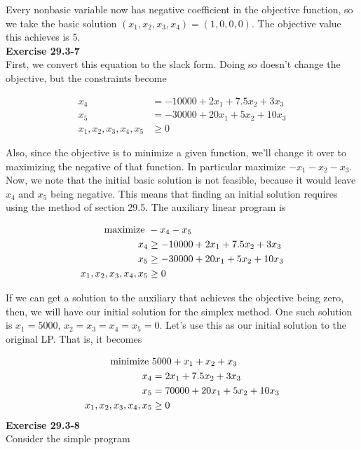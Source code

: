 \documentclass{article}
\begin{document}
Every nonbasic variable now has negative coefficient in the objective function, so we take the basic solution $(x_1,x_2,x_3,x_4) = (1,0,0,0)$. The objective value this achieves is 5. \\


\noindent\textbf{Exercise 29.3-7}\\

First, we convert this equation to the slack form. Doing so doesn't change the objective, but the constraints become

\begin{align*}
x_4 & = -10000 + 2x_1 + 7.5x_2 + 3x_3\\
x_5 & = -30000 + 20x_1 + 5x_2 + 10x_3 \\
x_1,x_2,x_3,x_4,x_5 &\ge 0
\end{align*}

Also, since the objective is to minimize a given function, we'll change it over to maximizing the negative of that function. In particular maximize $-x_1 -x_2 -x_3$. Now, we note that the initial basic solution is not feasible, because it would leave $x_4$ and $x_5$ being negative. This means that finding an initial solution requires using the method of section 29.5. The auxiliary linear program is

\begin{align*}
\hbox{maximize } &-x_4-x_5\\ 
x_4 & \ge -10000 + 2x_1 + 7.5x_2 + 3x_3\\
x_5 & \ge -30000 + 20x_1 + 5x_2 + 10x_3 \\
x_1,x_2,x_3,x_4,x_5 &\ge 0
\end{align*}

If we can get a solution to the auxiliary that achieves the objective being zero, then, we will have our initial solution for the simplex method. One such solution is $x_1 = 5000$, $x_2=x_3=x_4=x_5=0$. Let's use this as our initial solution to the original LP. That is, it becomes

\begin{align*}
\hbox{minimize } &5000 + x_1 + x_2 + x_3\\ 
x_4 & =  2x_1 + 7.5x_2 + 3x_3\\
x_5 & = 70000 + 20x_1 + 5x_2 + 10x_3 \\
x_1,x_2,x_3,x_4,x_5 &\ge 0
\end{align*}
\noindent\textbf{Exercise 29.3-8}\\

Consider the simple program
\end{document}
